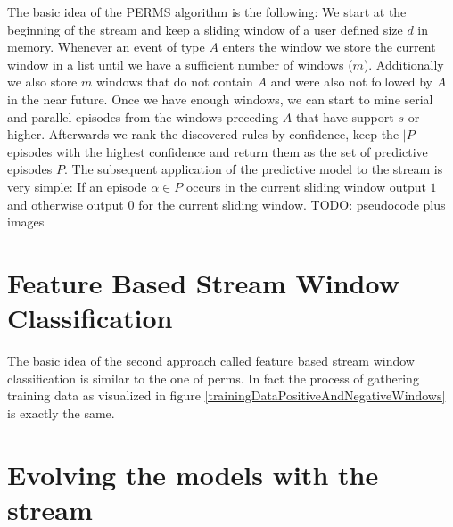 The basic idea of the PERMS algorithm is the following:
We start at the beginning of the stream and keep a sliding window of a user defined size $d$ in memory. Whenever an event of type $A$ enters the window we store the current window in a list until we have a sufficient number of windows ($m$). Additionally we also store $m$ windows that do not contain $A$ and were also not followed by $A$ in the near future. Once we have enough windows, we can start to mine serial and parallel episodes from the windows preceding $A$ that have support $s$ or higher. Afterwards we rank the discovered rules by confidence, keep the $|P|$ episodes with the highest confidence and return them as the set of predictive episodes $P$.
The subsequent application of the predictive model to the stream is very simple: If an episode $\alpha \in P$ occurs in the current sliding window output $1$ and otherwise output $0$ for the current sliding window.
TODO: pseudocode plus images

\section{Feature Based Stream Window Classification}
\label{sec_FeatureBasedStreamWindowClassification}

The basic idea of the second approach called feature based stream window classification is similar to the one of perms. In fact the process of gathering training data as visualized in figure \ref{trainingDataPositiveAndNegativeWindows} is exactly the same. 


\section{Evolving the models with the stream}